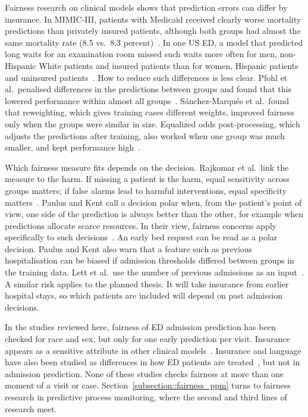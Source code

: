 Fairness research on clinical models shows that prediction errors can differ by insurance. In MIMIC-III, patients with Medicaid received clearly worse mortality predictions than privately insured patients, although both groups had almost the same mortality rate (8.5 vs.\ 8.3 percent)~\cite{roosli2022peeking}. In one US ED, a model that predicted long waits for an examination room missed such waits more often for men, non-Hispanic White patients and insured patients than for women, Hispanic patients and uninsured patients~\cite{wang2025evaluating}. How to reduce such differences is less clear. Pfohl et al.\ penalised differences in the predictions between groups and found that this lowered performance within almost all groups~\cite{pfohl2021empirical}. Sánchez-Marqués et al.\ found that reweighting, which gives training cases different weights, improved fairness only when the groups were similar in size. Equalized odds post-processing, which adjusts the predictions after training, also worked when one group was much smaller, and kept performance high~\cite{sanchezmarques2026addressing}.

Which fairness measure fits depends on the decision. Rajkomar et al.\ link the measure to the harm. If missing a patient is the harm, equal sensitivity across groups matters; if false alarms lead to harmful interventions, equal specificity matters~\cite{rajkomar2018ensuring}. Paulus and Kent call a decision polar when, from the patient's point of view, one side of the prediction is always better than the other, for example when predictions allocate scarce resources. In their view, fairness concerns apply specifically to such decisions~\cite{paulus2020predictably}. An early bed request can be read as a polar decision. Paulus and Kent also warn that a feature such as previous hospitalisation can be biased if admission thresholds differed between groups in the training data. Lett et al.\ use the number of previous admissions as an input~\cite{lett2025intersectional}. A similar risk applies to the planned thesis. It will take insurance from earlier hospital stays, so which patients are included will depend on past admission decisions.

In the studies reviewed here, fairness of ED admission prediction has been checked for race and sex, but only for one early prediction per visit. Insurance appears as a sensitive attribute in other clinical models~\cite{roosli2022peeking,wang2025evaluating}. Insurance and language have also been studied as differences in how ED patients are treated~\cite{venkatesh2019association,schulson2018emergency}, but not in admission prediction. None of these studies checks fairness at more than one moment of a visit or case. Section~\ref{subsection::fairness_ppm} turns to fairness research in predictive process monitoring, where the second and third lines of research meet.

